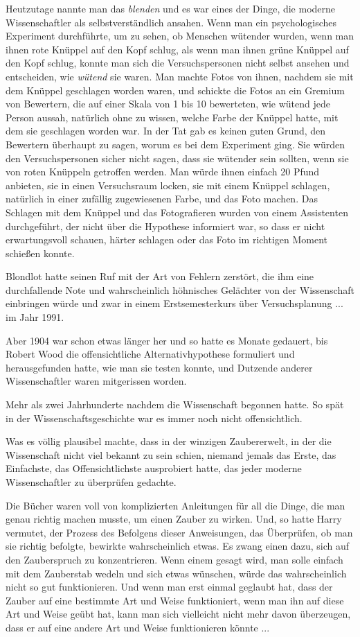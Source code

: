Heutzutage nannte man das \glqq{}\emph{blenden}\grqq{} und es war eines der
Dinge, die moderne Wissenschaftler als selbstverständlich ansahen. Wenn man ein
psychologisches Experiment durchführte, um zu sehen, ob Menschen wütender
wurden, wenn man ihnen rote Knüppel auf den Kopf schlug, als wenn man ihnen
grüne Knüppel auf den Kopf schlug, konnte man sich die Versuchspersonen nicht
selbst ansehen und entscheiden, wie \glqq{}\emph{wütend}\grqq{} sie waren. Man
machte Fotos von ihnen, nachdem sie mit dem Knüppel geschlagen worden waren, und
schickte die Fotos an ein Gremium von Bewertern, die auf einer Skala von 1 bis
10 bewerteten, wie wütend jede Person aussah, natürlich ohne zu wissen, welche
Farbe der Knüppel hatte, mit dem sie geschlagen worden war. In der Tat gab es
keinen guten Grund, den Bewertern überhaupt zu sagen, worum es bei dem
Experiment ging. Sie würden den Versuchspersonen sicher nicht sagen, dass sie
wütender sein sollten, wenn sie von roten Knüppeln getroffen werden. Man würde
ihnen einfach 20 Pfund anbieten, sie in einen Versuchsraum locken, sie mit einem
Knüppel schlagen, natürlich in einer zufällig zugewiesenen Farbe, und das Foto
machen. Das Schlagen mit dem Knüppel und das Fotografieren wurden von einem
Assistenten durchgeführt, der nicht über die Hypothese informiert war, so dass
er nicht erwartungsvoll schauen, härter schlagen oder das Foto im richtigen
Moment schießen konnte.

Blondlot hatte seinen Ruf mit der Art von Fehlern zerstört, die ihm eine
durchfallende Note und wahrscheinlich höhnisches Gelächter von der Wissenschaft
einbringen würde und zwar in einem Erstsemesterkurs über Versuchsplanung ... im
Jahr 1991.

Aber 1904 war schon etwas länger her und so hatte es Monate gedauert, bis Robert
Wood die offensichtliche Alternativhypothese formuliert und herausgefunden
hatte, wie man sie testen konnte, und Dutzende anderer Wissenschaftler waren
mitgerissen worden.

Mehr als zwei Jahrhunderte nachdem die Wissenschaft begonnen hatte. So spät in
der Wissenschaftsgeschichte war es immer noch nicht offensichtlich.

Was es völlig plausibel machte, dass in der winzigen Zaubererwelt, in der die
Wissenschaft nicht viel bekannt zu sein schien, niemand jemals das Erste, das
Einfachste, das Offensichtlichste ausprobiert hatte, das jeder moderne
Wissenschaftler zu überprüfen gedachte.

Die Bücher waren voll von komplizierten Anleitungen für all die Dinge, die man
genau richtig machen musste, um einen Zauber zu wirken. Und, so hatte Harry
vermutet, der Prozess des Befolgens dieser Anweisungen, das Überprüfen, ob man
sie richtig befolgte, bewirkte wahrscheinlich etwas. Es zwang einen dazu, sich
auf den Zauberspruch zu konzentrieren. Wenn einem gesagt wird, man solle einfach
mit dem Zauberstab wedeln und sich etwas wünschen, würde das wahrscheinlich
nicht so gut funktionieren. Und wenn man erst einmal geglaubt hat, dass der
Zauber auf eine bestimmte Art und Weise funktioniert, wenn man ihn auf diese Art
und Weise geübt hat, kann man sich vielleicht nicht mehr davon überzeugen, dass
er auf eine andere Art und Weise funktionieren könnte ...

